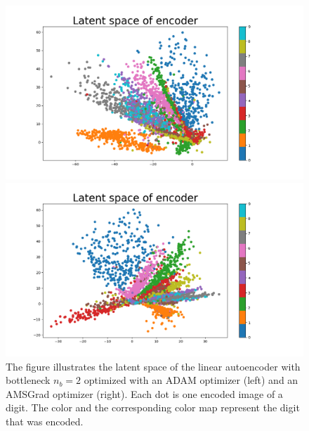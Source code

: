 \begin{figure}
\begin{center}
   \begin{minipage}[b]{0.49\linewidth}
      \includegraphics[width=\linewidth]{linear_AE_2d_adam_latent}
	\end{minipage}
	\begin{minipage}[b]{0.49\linewidth}
      \includegraphics[width=\linewidth]{linear_AE_2d_amsgrad_latent}
	\end{minipage}
\end{center}
\caption{The figure illustrates the latent space of the linear autoencoder with bottleneck $n_b=2$ optimized with an ADAM optimizer (left) and an AMSGrad optimizer (right). Each dot is one encoded image of a digit. The color and the corresponding color map represent the digit that was encoded.}\label{fig:linear_AE_2d_latent}
\end{figure}


